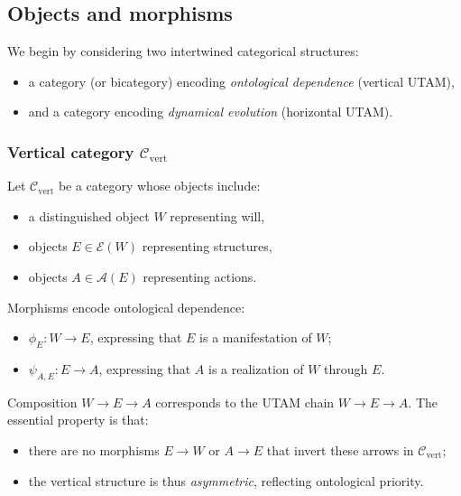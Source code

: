 \documentclass[12pt,a4paper]{report}
\newcommand{\Will}{W}
\begin{document}
\subsection*{Objects and morphisms}

We begin by considering two intertwined categorical structures:

\begin{itemize}[leftmargin=2em]
    \item a category (or bicategory) encoding \emph{ontological dependence} (vertical UTAM),
    \item and a category encoding \emph{dynamical evolution} (horizontal UTAM).
\end{itemize}

\subsubsection*{Vertical category \(\mathcal{C}_{\mathrm{vert}}\)}

Let \(\mathcal{C}_{\mathrm{vert}}\) be a category whose objects include:

\begin{itemize}[leftmargin=2em]
    \item a distinguished object \(W\) representing will,
    \item objects \(E \in \mathcal{E}(\Will)\) representing structures,
    \item objects \(A \in \mathcal{A}(E)\) representing actions.
\end{itemize}

Morphisms encode ontological dependence:

\begin{itemize}[leftmargin=2em]
    \item \(\phi_E : W \to E\), expressing that \(E\) is a manifestation of \(W\);
    \item \(\psi_{A,E} : E \to A\), expressing that \(A\) is a realization of \(W\) through \(E\).
\end{itemize}

Composition \(W \to E \to A\) corresponds to the UTAM chain \(W \to E \to A\). The essential property is that:

\begin{itemize}[leftmargin=2em]
    \item there are no morphisms \(E \to W\) or \(A \to E\) that invert these arrows in \(\mathcal{C}_{\mathrm{vert}}\);
    \item the vertical structure is thus \emph{asymmetric}, reflecting ontological priority.
\end{itemize}
\end{document}
